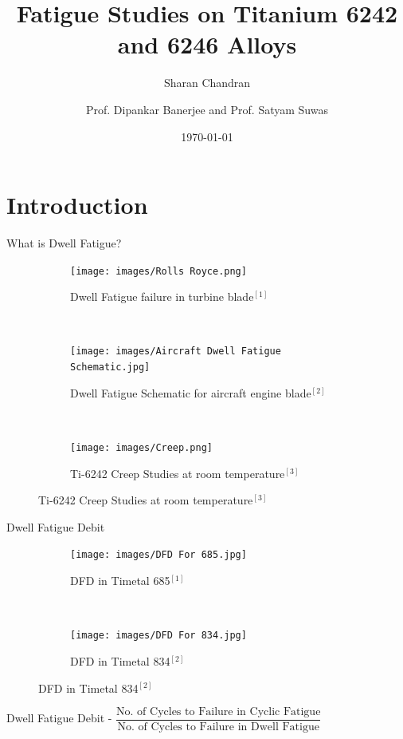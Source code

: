 \documentclass[10pt]{beamer}
\title{Fatigue Studies on Titanium 6242 and 6246 Alloys}
\subtitle{Sharan Chandran}
\date{\today}
\date{}
\author{Prof. Dipankar Banerjee and Prof. Satyam Suwas}
\institute{Indian Institute of Science}
\begin{document}

\maketitle

\section{Introduction}

{%
\begin{frame}[fragile]{What is Dwell Fatigue?}

\begin{figure}[H]
    \centering
    \begin{subfigure}{0.45\textwidth}
        \texttt{[image: images/Rolls Royce.png]}
        \caption{\tiny Dwell Fatigue failure in turbine blade$^{[1]}$}
        \end{subfigure}
    ~
    \begin{subfigure}{0.45\textwidth}
        \texttt{[image: images/Aircraft Dwell Fatigue Schematic.jpg]}
        \caption{\tiny Dwell Fatigue Schematic for aircraft engine blade$^{[2]}$}
        \end{subfigure}  
	\\	
    \begin{subfigure}{0.45\textwidth}
        \texttt{[image: images/Creep.png]}
        \caption{\tiny Ti-6242 Creep Studies at room temperature$^{[3]}$}
    \end{subfigure}   
\end{figure}
\end{frame}
}


{%
\begin{frame}[fragile]{Dwell Fatigue Debit}

\begin{figure}[H]
    \centering
    \begin{subfigure}{0.40\textwidth}
        \texttt{[image: images/DFD For 685.jpg]}
        \caption{DFD in Timetal 685$^{[1]}$}
        \end{subfigure}
    ~
    \begin{subfigure}{0.50\textwidth}
        \texttt{[image: images/DFD For 834.jpg]}
        \caption{DFD in Timetal 834$^{[2]}$}
    \end{subfigure}   
\end{figure}

Dwell Fatigue Debit - $ \dfrac{\text{No. of Cycles to Failure in Cyclic Fatigue}}{\text{No. of Cycles to Failure in Dwell Fatigue}} $  

\end{frame}
}
\end{document}
